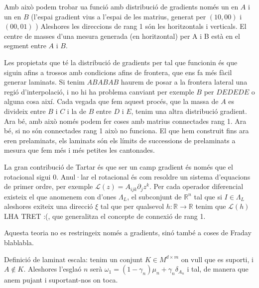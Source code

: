 Amb això podem trobar ua funció amb distribució de gradients només un en $A$ i un en $B$ (l'espai gradient vius a l'espai de les matrius, generat per $(1 0, 0 0)$ i $(0 0, 0 1)$ ) Aleshores les direccions de rang 1 són les horitzontals i verticals. El centre de masses d'una mesura generada (en horitzontal) per A i B està en el segment entre $A$ i $B$.

Les propietats que té la distribució de gradients per tal que funcionin és que siguin afins a trossos amb condicions afins de frontera, que ens fa més fàcil generar laminats. Si tenim $ABABAB$ haurem de posar a la frontera lateral una regió d'interpolació, i no hi ha problema canviant per exemple $B$ per $DEDEDE$ o alguna cosa així. Cada vegada que fem aquest procés, que la massa de $A$ es divideix entre $B$ i $C$ i la de $B$ entre $D$ i $E$, tenim una altra distribució gradient. 
Ara bé, amb això només podem fer coses amb matrius connectades rang 1. Ara bé, si no són connectades rang 1 això no funciona. El que hem construit fins ara eren prelaminats, els laminats són els límits de successions de prelaminats a mesura que fem més i més petites les cantonades.

La gran contribució de Tartar és que ser un camp gradient és només que el rotacional sigui 0. Anul·lar el rotacional és com resoldre un sistema d'equacions de primer ordre, per exemple $\mathcal L(z) = A_{ijk}\partial_j z^k$. Per cada operador diferencial existeix el que anomenem con d'ones $\Lambda_L$, el subconjunt de $\mathbb R^n$ tal que si $I\in\Lambda_L$ aleshores exiteix una direcció $\xi$ tal que per qualsevol $h:\mathbb R\to \mathbb R$ tenim que $\mathcal L(h)$ LHA TRET :(, que generalitza el concepte de connexió de rang 1.

Aquesta teoria no es restringeix només a gradients, sinó també a coses de Fraday blablabla.

Definició de laminat escala: tenim un conjunt $K\in M^{d\times m}$ on vull que es suporti, i $A\not\in K$. Aleshores l'esglaó $n$ serà $\omega_1=(1-\gamma_n)\mu_n+\gamma_n\delta_{A_n}$ i tal, de manera que anem pujant i suportant-nos on toca.











